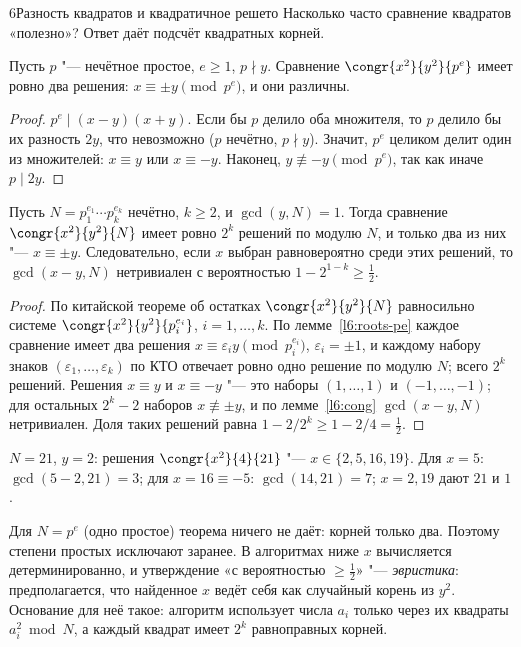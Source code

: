 \begin{lecture}{6}{Разность квадратов и квадратичное решето}
Насколько часто сравнение квадратов «полезно»? Ответ даёт подсчёт квадратных корней.

\begin{lemma}\label{l6:roots-pe}
Пусть $p$ "--- нечётное простое, $e \ge 1$, $p \nmid y$. Сравнение $\congr{x^2}{y^2}{p^e}$ имеет
ровно два решения: $x \equiv \pm y \pmod{p^e}$, и они различны.
\end{lemma}

\begin{proof}
$p^e \mid (x - y)(x + y)$. Если бы $p$ делило оба множителя, то $p$ делило бы их разность $2y$,
что невозможно ($p$ нечётно, $p \nmid y$). Значит, $p^e$ целиком делит один из множителей:
$x \equiv y$ или $x \equiv -y$. Наконец, $y \not\equiv -y \pmod{p^e}$, так как иначе $p \mid 2y$.
\end{proof}

\begin{theorem}\label{l6:half}
Пусть $N = p_1^{e_1} \cdots p_k^{e_k}$ нечётно, $k \ge 2$, и $\gcd(y, N) = 1$. Тогда
сравнение $\congr{x^2}{y^2}{N}$ имеет ровно $2^k$ решений по модулю $N$, и только два из них
"--- $x \equiv \pm y$. Следовательно, если $x$ выбран равновероятно среди этих решений, то
$\gcd(x - y, N)$ нетривиален с вероятностью $1 - 2^{1-k} \ge \frac12$.
\end{theorem}

\begin{proof}
По китайской теореме об остатках $\congr{x^2}{y^2}{N}$ равносильно системе
$\congr{x^2}{y^2}{p_i^{e_i}}$, $i = 1, \dots, k$. По лемме~\ref{l6:roots-pe} каждое сравнение
имеет два решения $x \equiv \varepsilon_i y \pmod{p_i^{e_i}}$, $\varepsilon_i = \pm 1$, и каждому
набору знаков $(\varepsilon_1, \dots, \varepsilon_k)$ по КТО отвечает ровно одно решение по модулю
$N$; всего $2^k$ решений. Решения $x \equiv y$ и $x \equiv -y$ "--- это наборы $(1, \dots, 1)$ и
$(-1, \dots, -1)$; для остальных $2^k - 2$ наборов $x \not\equiv \pm y$, и по
лемме~\ref{l6:cong} $\gcd(x - y, N)$ нетривиален. Доля таких решений равна
$1 - 2/2^k \ge 1 - 2/4 = \frac12$.
\end{proof}

\begin{example}
$N = 21$, $y = 2$: решения $\congr{x^2}{4}{21}$ "--- $x \in \{2, 5, 16, 19\}$. Для $x = 5$:
$\gcd(5 - 2, 21) = 3$; для $x = 16 \equiv -5$: $\gcd(14, 21) = 7$; $x = 2, 19$ дают $21$ и $1$.
\end{example}

Для $N = p^e$ (одно простое) теорема ничего не даёт: корней только два. Поэтому степени
простых исключают заранее. В алгоритмах ниже $x$ вычисляется детерминированно, и утверждение
«с вероятностью $\ge \frac12$» "--- \emph{эвристика}: предполагается, что найденное $x$ ведёт себя
как случайный корень из $y^2$. Основание для неё такое: алгоритм использует числа $a_i$
только через их квадраты $a_i^2 \bmod N$, а каждый квадрат имеет $2^k$ равноправных корней.


\end{lecture}
